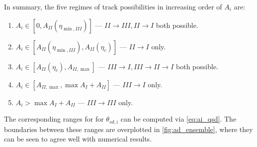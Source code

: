 \documentclass[
        fleqn,
        usenatbib,
        referee,
    ]{mnras}
\newcommand*{\p}[1]{\left(#1\right)}
\newcommand*{\s}[1]{\left[#1\right]}
\begin{document}
In summary, the five regimes of track possibilities in increasing order of $A_i$
are:
\begin{enumerate}
    \item $A_i \in \s{0, A_{II}\p{\eta_{\min, III}}}$ --- $II \to III, II \to I$
        both possible.

    \item $A_i \in \s{A_{II}\p{\eta_{\min, III}}, A_{II}(\eta_c)}$ --- $II \to
        I$ only.

    \item $A_i \in \s{A_{II}(\eta_c), A_{II, \max}}$ --- $III \to I, III \to II
        \to I$ both possible.

    \item $A_i \in \s{A_{II, \max}, \max A_I + A_{II}}$ --- $III \to I$ only.

    \item $A_i > \max A_I + A_{II}$ --- $III \to III$ only.
\end{enumerate}
The corresponding ranges for for $\theta_{sd,i}$ can be computed via
\autoref{eq:ai_qsd}. The boundaries between these ranges are overplotted in
\autoref{fig:ad_ensemble}, where they can be seen to agree well with numerical
results.
\end{document}
